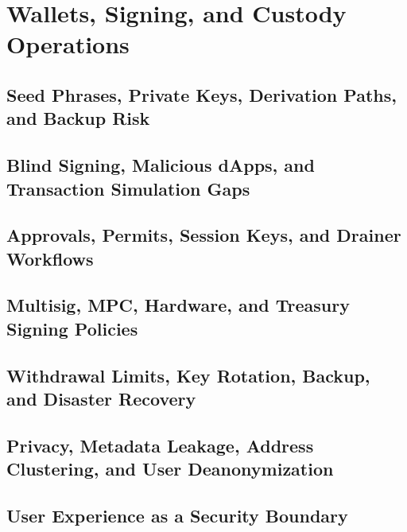 \chapter{Wallets, Signing, and Custody Operations}

\section{Seed Phrases, Private Keys, Derivation Paths, and Backup Risk}

\section{Blind Signing, Malicious dApps, and Transaction Simulation Gaps}

\section{Approvals, Permits, Session Keys, and Drainer Workflows}

\section{Multisig, MPC, Hardware, and Treasury Signing Policies}

\section{Withdrawal Limits, Key Rotation, Backup, and Disaster Recovery}

\section{Privacy, Metadata Leakage, Address Clustering, and User Deanonymization}

\section{User Experience as a Security Boundary}
